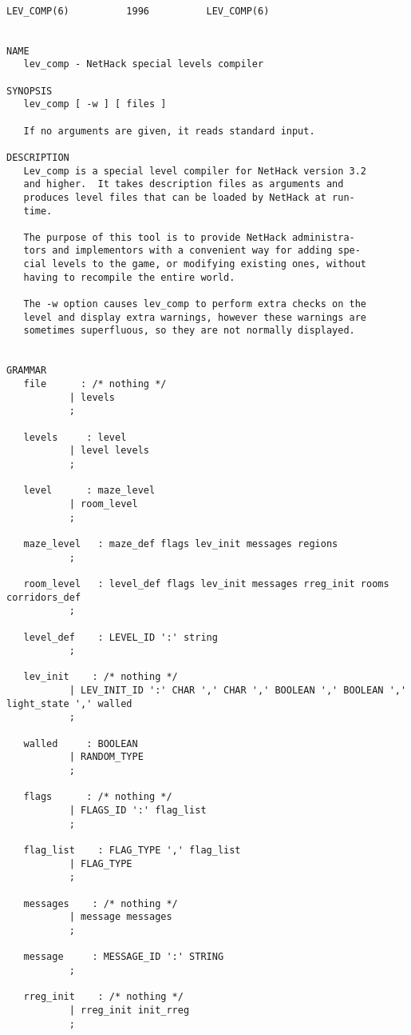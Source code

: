 \documentclass[11pt]{article}
\begin{document}
\begin{verbatim}

LEV_COMP(6)          1996          LEV_COMP(6)


NAME
   lev_comp - NetHack special levels compiler

SYNOPSIS
   lev_comp [ -w ] [ files ]

   If no arguments are given, it reads standard input.

DESCRIPTION
   Lev_comp is a special level compiler for NetHack version 3.2
   and higher.  It takes description files as arguments and
   produces level files that can be loaded by NetHack at run-
   time.

   The purpose of this tool is to provide NetHack administra-
   tors and implementors with a convenient way for adding spe-
   cial levels to the game, or modifying existing ones, without
   having to recompile the entire world.

   The -w option causes lev_comp to perform extra checks on the
   level and display extra warnings, however these warnings are
   sometimes superfluous, so they are not normally displayed.


GRAMMAR
   file      : /* nothing */
           | levels
           ;

   levels     : level
           | level levels
           ;

   level      : maze_level
           | room_level
           ;

   maze_level   : maze_def flags lev_init messages regions
           ;

   room_level   : level_def flags lev_init messages rreg_init rooms corridors_def
           ;

   level_def    : LEVEL_ID ':' string
           ;

   lev_init    : /* nothing */
           | LEV_INIT_ID ':' CHAR ',' CHAR ',' BOOLEAN ',' BOOLEAN ',' light_state ',' walled
           ;

   walled     : BOOLEAN
           | RANDOM_TYPE
           ;

   flags      : /* nothing */
           | FLAGS_ID ':' flag_list
           ;

   flag_list    : FLAG_TYPE ',' flag_list
           | FLAG_TYPE
           ;

   messages    : /* nothing */
           | message messages
           ;

   message     : MESSAGE_ID ':' STRING
           ;

   rreg_init    : /* nothing */
           | rreg_init init_rreg
           ;


\end{verbatim}
\end{document}
